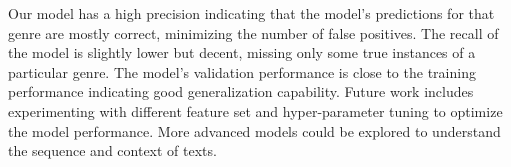 \documentclass[hbrs-poster.tex]{subfiles}
\begin{document}
    {
        Our model has a high precision indicating that the model's predictions for that genre are mostly correct, minimizing the number of false positives.  The recall of the model is slightly lower but decent, missing only some true instances of a particular genre. The model's validation performance is close to the training performance indicating good generalization capability.
        \newline
        Future work includes experimenting with different feature set and hyper-parameter tuning to optimize the model performance. More advanced models could be explored to understand the sequence and context of texts.

    }
\end{document}
